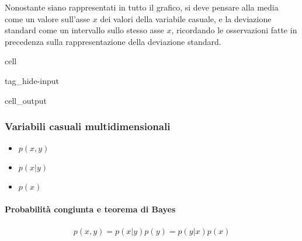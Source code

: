 \documentclass[letterpaper,10pt,italian]{jupyterBook}
\begin{document}
\sphinxAtStartPar
{} Nonostante siano rappresentati in tutto il grafico, si deve pensare alla media come un valore sull’asse \(x\) dei valori della variabile casuale, e la deviazione standard come un intervallo sullo stesso asse \(x\), ricordando le osservazioni fatte in precedenza sulla rappresentazione della deviazione standard.

\begin{sphinxuseclass}{cell}
\begin{sphinxuseclass}{tag_hide-input}\begin{sphinxVerbatimOutput}

\begin{sphinxuseclass}{cell_output}
\noindent{}

\end{sphinxuseclass}\end{sphinxVerbatimOutput}

\end{sphinxuseclass}
\end{sphinxuseclass}



\subsubsection{Variabili casuali multi\sphinxhyphen{}dimensionali}
\label{\detokenize{ch/statistics/random_variables_discrete:variabili-casuali-multi-dimensionali}}\begin{itemize}
\item {} 
\sphinxAtStartPar
{} \(p(x,y)\)

\item {} 
\sphinxAtStartPar
{} \(p(x|y)\)

\item {} 
\sphinxAtStartPar
{} \(p(x)\)

\end{itemize}


\paragraph{Probabilità congiunta e teorema di Bayes}
\label{\detokenize{ch/statistics/random_variables_discrete:probabilita-congiunta-e-teorema-di-bayes}}\begin{equation}\label{equation:ch/statistics/random_variables_discrete:eq:joint-prob}
\begin{split}p(x,y) = p(x|y)p(y) = p(y|x)p(x)\end{split}
\end{equation}
\end{document}

